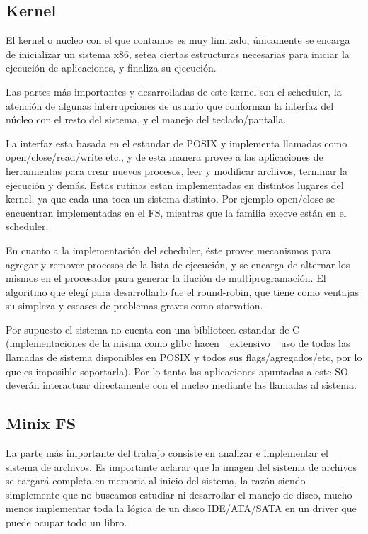 \subsection{Kernel}

El kernel o nucleo con el que contamos es muy limitado, únicamente se encarga de
inicializar un sistema x86, setea ciertas estructuras necesarias para iniciar la
ejecución de aplicaciones, y finaliza su ejecución.

Las partes más importantes y desarrolladas de este kernel son el scheduler, la
atención de algunas interrupciones de usuario que conforman la interfaz del
núcleo con el resto del sistema, y el manejo del teclado/pantalla.

La interfaz esta basada en el estandar de POSIX y implementa llamadas como
open/close/read/write etc., y de esta manera provee a las aplicaciones de
herramientas para crear nuevos procesos, leer y modificar archivos, terminar
la ejecución y demás. Estas rutinas estan implementadas en distintos lugares
del kernel, ya que cada una toca un sistema distinto. Por ejemplo open/close
se encuentran implementadas en el FS, mientras que la familia execve están en
el scheduler.

En cuanto a la implementación del scheduler, éste provee mecanismos para agregar
y remover procesos de la lista de ejecución, y se encarga de alternar los mismos
en el procesador para generar la ilución de multiprogramación. El algoritmo que
elegí para desarrollarlo fue el round-robin, que tiene como ventajas su simpleza
y escases de problemas graves como starvation.

Por supuesto el sistema no cuenta con una biblioteca estandar de C
(implementaciones de la misma como glibc hacen \_extensivo\_ uso de todas las
llamadas de sistema disponibles en POSIX y todos sus flags/agregados/etc, por lo
que es imposible soportarla). Por lo tanto las aplicaciones apuntadas a este SO
deverán interactuar directamente con el nucleo mediante las llamadas al sistema.

\subsection{Minix FS}

La parte más importante del trabajo consiste en analizar e implementar el
sistema de archivos. Es importante aclarar que la imagen del sistema de archivos
se cargará completa en memoria al inicio del sistema, la razón siendo
simplemente que no buscamos estudiar ni desarrollar el manejo de disco, mucho
menos implementar toda la lógica de un disco IDE/ATA/SATA en un driver que puede
ocupar todo un libro.


